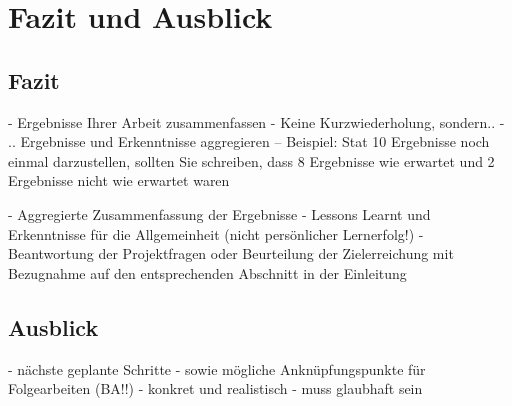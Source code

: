 \section{Fazit und Ausblick}


\subsection{Fazit}
- Ergebnisse Ihrer Arbeit zusammenfassen
- Keine Kurzwiederholung, sondern..
- .. Ergebnisse und Erkenntnisse aggregieren
-- Beispiel: Stat 10 Ergebnisse noch einmal darzustellen, sollten Sie schreiben, dass 8 Ergebnisse wie erwartet und 2 Ergebnisse nicht wie erwartet waren

- Aggregierte Zusammenfassung der Ergebnisse
- Lessons Learnt und Erkenntnisse für die Allgemeinheit (nicht persönlicher Lernerfolg!)
- Beantwortung der Projektfragen oder Beurteilung der Zielerreichung mit Bezugnahme auf den entsprechenden Abschnitt in der Einleitung


\subsection{Ausblick}
- nächste geplante Schritte
- sowie mögliche Anknüpfungspunkte für Folgearbeiten (BA!!)
- konkret und realistisch
- muss glaubhaft sein
